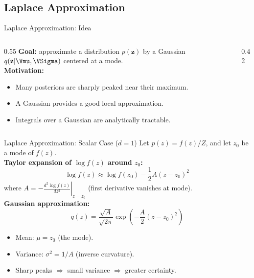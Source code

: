 \subsection{Laplace Approximation}

\begin{frame}{Laplace Approximation: Idea}
  \begin{columns}[T]
    \begin{column}{0.55\textwidth}
      \textbf{Goal:} approximate a distribution $p(\mathbf{z})$ by a Gaussian $q(\mathbf{z}|\Vmu,\VSigma)$ centered at a mode.\\[0.4em]
      \textbf{Motivation:}
      \begin{itemize}
        \item Many posteriors are sharply peaked near their maximum.
        \item A Gaussian provides a good local approximation.
        \item Integrals over a Gaussian are analytically tractable.
      \end{itemize}
    \end{column}
    \begin{column}{0.42\textwidth}
    \end{column}
  \end{columns}
\end{frame}

\begin{frame}{Laplace Approximation: Scalar Case ($d=1$)}
  Let $p(z) = f(z)/Z$, and let $z_0$ be a mode of $f(z)$.\\[0.3em]
  \textbf{Taylor expansion of $\log f(z)$ around $z_0$:}
  \[
    \log f(z) \approx \log f(z_0) - \frac{1}{2}A(z-z_0)^2
  \]
  where $A = -\left.\frac{d^2\log f(z)}{dz^2}\right|_{z=z_0}$ (first derivative vanishes at mode).\\[0.3em]
  \textbf{Gaussian approximation:}
  \[
    q(z) = \frac{\sqrt{A}}{\sqrt{2\pi}}\exp\!\left(-\frac{A}{2}(z-z_0)^2\right)
  \]
  \begin{itemize}
    \item Mean: $\mu = z_0$ (the mode).
    \item Variance: $\sigma^2 = 1/A$ (inverse curvature).
    \item Sharp peaks $\Rightarrow$ small variance $\Rightarrow$ greater certainty.
  \end{itemize}
\end{frame}

